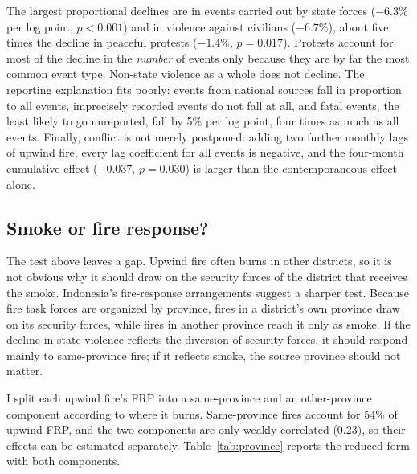 \documentclass[12pt]{article}
\begin{document}
The largest proportional declines are in events carried out by state forces ($-6.3\%$ per log point, $p<0.001$) and in violence against civilians ($-6.7\%$), about five times the decline in peaceful protests ($-1.4\%$, $p=0.017$). Protests account for most of the decline in the \emph{number} of events only because they are by far the most common event type. Non-state violence as a whole does not decline. The reporting explanation fits poorly: events from national sources fall in proportion to all events, imprecisely recorded events do not fall at all, and fatal events, the least likely to go unreported, fall by 5\% per log point, four times as much as all events. Finally, conflict is not merely postponed: adding two further monthly lags of upwind fire, every lag coefficient for all events is negative, and the four-month cumulative effect ($-0.037$, $p=0.030$) is larger than the contemporaneous effect alone.

\subsection{Smoke or fire response?}
\label{sec:province}

The test above leaves a gap. Upwind fire often burns in other districts, so it is not obvious why it should draw on the security forces of the district that receives the smoke. Indonesia's fire-response arrangements suggest a sharper test. Because fire task forces are organized by province, fires in a district's own province draw on its security forces, while fires in another province reach it only as smoke. If the decline in state violence reflects the diversion of security forces, it should respond mainly to same-province fire; if it reflects smoke, the source province should not matter.

I split each upwind fire's FRP into a same-province and an other-province component according to where it burns. Same-province fires account for 54\% of upwind FRP, and the two components are only weakly correlated (0.23), so their effects can be estimated separately. Table~\ref{tab:province} reports the reduced form with both components.
\end{document}
